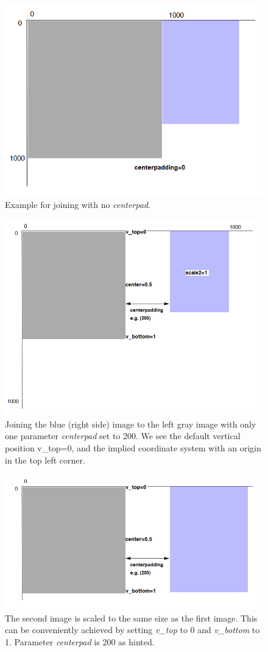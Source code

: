 \documentclass[a4paper, 12pt, bibliography=totoc]{scrartcl}
\begin{document}
\begin{figure}[H]
	\centering
	\includegraphics[width=0.6\linewidth]{images/svgjoinpad0.png}
	\caption{Example for joining with no \textit{centerpad}.}
	\label{fig:svgjoinpad0}
\end{figure}

\begin{figure}[H]
	\centering
	\includegraphics[width=0.8\linewidth]{images/svgjoinpad200.png}
	\caption{Joining the blue (right side) image to the left gray image with only one parameter \textit{centerpad} set to 200. We see the default vertical position v\_top=0, and the implied coordinate system with an origin in the top left corner.}
	\label{fig:svgjoinpad200}
\end{figure}

\begin{figure}[H]
	\centering
	\includegraphics[width=0.8\linewidth]{images/svgjoinscale1.png}
	\caption{The second image is scaled to the same size as the first image. This can be conveniently achieved by setting \textit{v\_top} to 0 and \textit{v\_bottom} to 1. Parameter \textit{centerpad} is 200 as hinted.}
	\label{fig:svgjoinscale1}
\end{figure}
\end{document}
